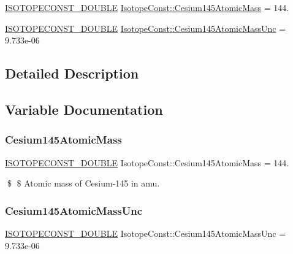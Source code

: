 \begin{DoxyCompactItemize}
\item 
\mbox{\hyperlink{group___isotope_const-_macros_ga8f45a7272ce02c0b4c65c44636ed719a}{I\+S\+O\+T\+O\+P\+E\+C\+O\+N\+S\+T\+\_\+\+D\+O\+U\+B\+LE}} \mbox{\hyperlink{group___isotope_const-_cesium-_cs145_gabc577c815b1cb761221b7d2604aea5b4}{Isotope\+Const\+::\+Cesium145\+Atomic\+Mass}} = 144.
\item 
\mbox{\hyperlink{group___isotope_const-_macros_ga8f45a7272ce02c0b4c65c44636ed719a}{I\+S\+O\+T\+O\+P\+E\+C\+O\+N\+S\+T\+\_\+\+D\+O\+U\+B\+LE}} \mbox{\hyperlink{group___isotope_const-_cesium-_cs145_gaf9033068cbe6cd8ec3d2a2b1a0e488e2}{Isotope\+Const\+::\+Cesium145\+Atomic\+Mass\+Unc}} = 9.\+733e-\/06
\end{DoxyCompactItemize}


\subsection{Detailed Description}


\subsection{Variable Documentation}
\mbox{\label{group___isotope_const-_cesium-_cs145_gabc577c815b1cb761221b7d2604aea5b4}} 
\subsubsection{\texorpdfstring{Cesium145\+Atomic\+Mass}{Cesium145AtomicMass}}
{\footnotesize\ttfamily \mbox{\hyperlink{group___isotope_const-_macros_ga8f45a7272ce02c0b4c65c44636ed719a}{I\+S\+O\+T\+O\+P\+E\+C\+O\+N\+S\+T\+\_\+\+D\+O\+U\+B\+LE}} Isotope\+Const\+::\+Cesium145\+Atomic\+Mass = 144.}

\$ \$ Atomic mass of Cesium-\/145 in amu. \mbox{\label{group___isotope_const-_cesium-_cs145_gaf9033068cbe6cd8ec3d2a2b1a0e488e2}} 
\subsubsection{\texorpdfstring{Cesium145\+Atomic\+Mass\+Unc}{Cesium145AtomicMassUnc}}
{\footnotesize\ttfamily \mbox{\hyperlink{group___isotope_const-_macros_ga8f45a7272ce02c0b4c65c44636ed719a}{I\+S\+O\+T\+O\+P\+E\+C\+O\+N\+S\+T\+\_\+\+D\+O\+U\+B\+LE}} Isotope\+Const\+::\+Cesium145\+Atomic\+Mass\+Unc = 9.\+733e-\/06}

